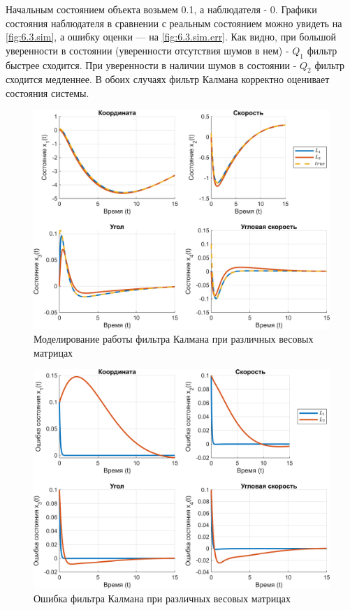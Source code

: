 Начальным состоянием объекта возьмем 0.1, а наблюдателя - 0.
Графики состояния наблюдателя в сравнении с реальным состоянием можно
увидеть на \autoref{fig:6.3.sim}, а ошибку оценки --- на \autoref{fig:6.3.sim.err}.
Как видно, при большой уверенности в состоянии (уверенности отсутствия шумов в нем) 
- $Q_1$ фильтр быстрее сходится. При уверенности в наличии шумов в состоянии 
- $Q_2$ фильтр сходится медленнее. В обоих случаях фильтр Калмана 
корректно оценивает состояния системы.
\begin{figure}[H]
    \centering
    \includegraphics[width=0.9\linewidth]{figs/6.3.sim.png}
    \caption{Моделирование работы фильтра Калмана при различных 
    весовых матрицах}
    \label{fig:6.3.sim}
\end{figure}
\begin{figure}[H]
    \centering
    \includegraphics[width=0.9\linewidth]{figs/6.3.sim.err.png}
    \caption{Ошибка фильтра Калмана при различных весовых матрицах}
    \label{fig:6.3.sim.err}
\end{figure}

